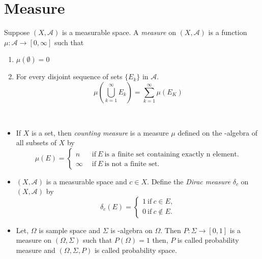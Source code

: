\section{Measure}

\begin{definition}[Measure]
    Suppose $(X,\mathcal{A})$ is a measurable space. A \textit{measure} on $(X,\mathcal{A})$ is a function $\mu:\mathcal{A}\to[0,\infty]$ such that
    \begin{enumerate}
        \item $\mu(\emptyset)=0$
        \item For every disjoint sequence of sets $\{E_k\}$ in  $\mathcal{A}$.
            \[
                \mu\left( \bigcup_{k=1}^{\infty}E_k \right) = \sum_{k=1}^{\infty}\mu(E_K)
            \]
    \end{enumerate}
\end{definition}

\begin{example}[]
    \  
    \begin{itemize}
        \item If $X$ is a set, then  \textit{counting measure} is a measure $\mu$ defined on the \sig-algebra of all subsets of  $X$ by 
            \[
                \mu(E)= 
                \begin{cases}
                    n \ \ \ \ &\text{if} \ E\ \text{is a finite set containing exactly n element.}\\
                    \infty\ &\text{if} \ E\ \text{is not a finite set.}
                \end{cases}
            \]
        \item $(X,\mathcal{A})$ is a measurable space and $c\in X$. Define the  \textit{Dirac measure} $\delta_c$ on  $(X,\mathcal{A})$ by
            \[
                \delta_c(E)=
                \begin{cases}
                    1 \ \text{if}\ c\in E,\\
                    0 \ \text{if}\ c\notin E.
                \end{cases}
            \]
        \item Let, $\Omega$ is sample space and $\Sigma$ is \sig-algebra on  $\Omega$. Then $P:\Sigma\to[0,1]$  is a measure on $(\Omega,\Sigma)$ such that  
            $P(\Omega)=1$ then, $P$ is called probability measure and $(\Omega,\Sigma,P)$ is called probability space.
    \end{itemize}
\end{example}

